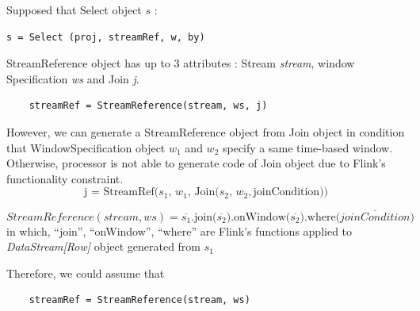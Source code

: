 Supposed that Select object $s$ :
\begin{lstlisting}
s = Select (proj, streamRef, w, by)
\end{lstlisting}

StreamReference object has up to 3 attributes :  Stream \textit{stream}, window Specification \textit{ws} and Join \textit{j}.
\begin{lstlisting}
	streamRef = StreamReference(stream, ws, j)
\end{lstlisting}

However, we can generate a StreamReference object from Join object in condition that WindowSpecification object $w_1$ and $w_2$ specify a same time-based window. Otherwise, processor is not able to generate code of Join object due to Flink's functionality constraint.
\begin{equation}
	\textrm{j = StreamRef(}s_1,\, w_1,\, \textrm{Join(}s_2,\, w_2, \textrm{joinCondition))}
\end{equation}

\begin{equation}
StreamReference(stream, ws) = \overline{  s_1}\textrm{.join(}\overline{s_2})\textrm{.onWindow(}\overline{s_2}\textrm{).where(}\overline{joinCondition}\textrm{)}
\end{equation}
in which, ``join'', ``onWindow'', ``where'' are Flink's functions applied to  \textit{DataStream[Row]} object generated from $s_1$

Therefore, we could assume that
\begin{lstlisting}
	streamRef = StreamReference(stream, ws)
\end{lstlisting}


